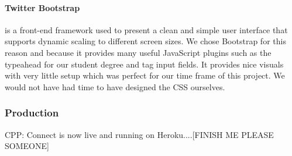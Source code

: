 		\paragraph{Twitter Bootstrap\cite{bootstrap}} is a front-end framework used to present a clean and simple user interface that supports dynamic scaling to different screen sizes. We chose Bootstrap for this reason and because it provides many useful JavaScript plugins such as the typeahead for our student degree and tag input fields. It provides nice visuals with very little setup which was perfect for our time frame of this project. We would not have had time to have designed the CSS ourselves.

	\subsubsection{Production}
		CPP: Connect is now live and running on Heroku\cite{heroku}....[FINISH ME PLEASE SOMEONE]
